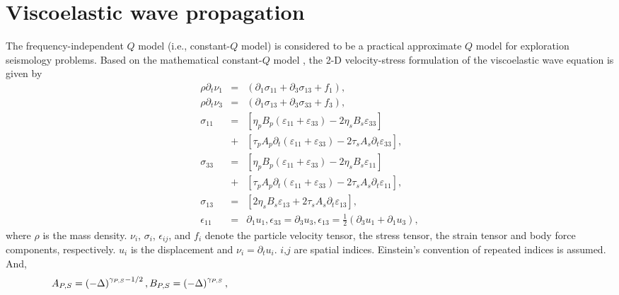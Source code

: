 \section{Viscoelastic wave propagation}
The frequency-independent $Q$ model (i.e., constant-$Q$ model) is considered to be a practical approximate $Q$ model for exploration seismology problems. Based on the mathematical constant-$Q$ model \cite[]{kja79}, the 2-D velocity-stress formulation of the viscoelastic wave equation is given by \cite[]{zhu14c}
\begin{eqnarray}                  
\rho \partial _t\nu _1 &=& \left (  \partial _1 \sigma_{11}+\partial _3 \sigma_{13}+f_1\right ),\label{eq:eq1}\\                   
\rho \partial _t\nu _3 &=& \left (  \partial _1 \sigma_{13}+\partial_3 \sigma_{33}+f_3\right ),\label{eq:eq2}\\                  
\sigma _{11} &=& \left [ \eta _pB_p(\varepsilon_{11}+\varepsilon_{33} )-2\eta _sB_s\varepsilon_{33}  \right ] \nonumber \\
&+& \left [ \tau _pA_p\partial _t (\varepsilon_{11}+\varepsilon_{33} )-2\tau _sA_s\partial _t \varepsilon_{33} \right ],\label{eq:eq3} \\
\sigma _{33} &=& \left [ \eta _pB_p(\varepsilon_{11}+\varepsilon_{33} )-2\eta _sB_s\varepsilon_{11}  \right ] \nonumber \\
&+& \left [ \tau _pA_p\partial _t (\varepsilon_{11}+\varepsilon_{33} )-2\tau _sA_s\partial _t \varepsilon_{11} \right ],\label{eq:eq4}\\        
\sigma _{13} &=& \left [ 2\eta _sB_s\varepsilon_{13}+2\tau _sA_s\partial _t \varepsilon_{13} \right ],\label{eq:eq5}\\              
\epsilon _{11} &=& \partial _1 u_1,\epsilon _{33}=\partial _3 u_3,\epsilon _{13}=\frac{1}{2}\left ( \partial _3 u_1+\partial _1 u_3 \right ), \label{eq:eq6}
\end{eqnarray}
where $\rho$ is the mass density. $\nu_i$, $\sigma_i$, $\epsilon_{ij}$, and $f_i$ denote the particle velocity tensor, the stress tensor, the strain tensor and body force components, respectively. $u_i$ is the displacement and $\nu_i=\partial_tu_i$. $i$,$j$ are spatial indices. Einstein’s convention of repeated indices is assumed. And,
\begin{equation}
\label{eq:eq7}                      
\hspace{0pt} A_{P,S}=\left ( -\Delta  \right )^{\gamma _{P,S}-1/2},B_{P,S}=\left ( -\Delta  \right )^{\gamma _{P,S}},\hspace{\linewidth minus\linewidth}
\end{equation}
